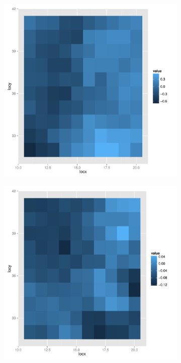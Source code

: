 \begin{figure}
        \begin{subfigure}[b]{0.3\textwidth}
                \centering
                \includegraphics[width=\textwidth]{Images-future-work/coef3-spatial.pdf}
        \end{subfigure}%
        \begin{subfigure}[b]{0.3\textwidth}
                \centering
                \includegraphics[width=\textwidth]{Images-future-work/coef4-spatial.pdf}

\end{subfigure}
\end{figure}
